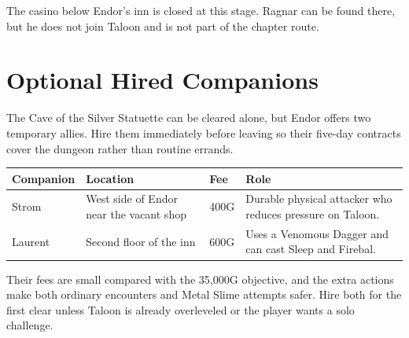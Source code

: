 \documentclass[
  american,
  10pt,
  letterpaper,
  oneside,
  open=any]{scrreprt}
\newcounter{none} %
\newenvironment{guidetable}{%
  \small\setstretch{1.0}%
  \setlength{\tabcolsep}{4pt}%
  \setlength{\LTpre}{8pt}\setlength{\LTpost}{10pt}%
  \renewcommand{\arraystretch}{1.16}%
}{ }
\begin{document}
The casino below Endor's inn is closed at this stage. Ragnar can be
found there, but he does not join Taloon and is not part of the chapter
route.

\section{Optional Hired Companions}\label{optional-hired-companions}

The Cave of the Silver Statuette can be cleared alone, but Endor offers
two temporary allies. Hire them immediately before leaving so their
five-day contracts cover the dungeon rather than routine errands.

\begin{guidetable}

{\def\LTcaptype{none} %
\begin{longtable}[]{@{}
  >{\raggedright\arraybackslash}p{}
  >{\raggedright\arraybackslash}p{}
  >{\raggedleft\arraybackslash}p{}
  >{\raggedright\arraybackslash}p{}@{}}
\toprule\noalign{}
\begin{minipage}[b]{\linewidth}\raggedright
\color{GuideGreen}\bfseries Companion
\end{minipage} & \begin{minipage}[b]{\linewidth}\raggedright
\color{GuideGreen}\bfseries Location
\end{minipage} & \begin{minipage}[b]{\linewidth}\raggedleft
\color{GuideGreen}\bfseries Fee
\end{minipage} & \begin{minipage}[b]{\linewidth}\raggedright
\color{GuideGreen}\bfseries Role
\end{minipage} \\
\midrule\noalign{}
\endhead
\bottomrule\noalign{}
\endlastfoot
Strom & West side of Endor near the vacant shop & 400G & Durable
physical attacker who reduces pressure on Taloon. \\
Laurent & Second floor of the inn & 600G & Uses a Venomous Dagger and
can cast Sleep and Firebal. \\
\end{longtable}
}

\end{guidetable}

Their fees are small compared with the 35,000G objective, and the extra
actions make both ordinary encounters and Metal Slime attempts safer.
Hire both for the first clear unless Taloon is already overleveled or
the player wants a solo challenge.
\end{document}
